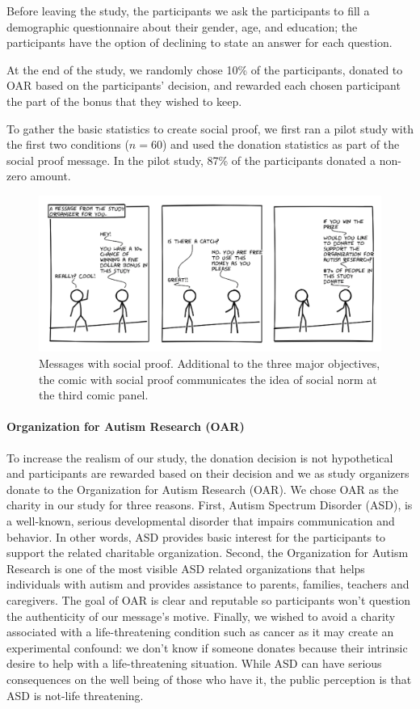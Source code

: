 Before leaving the study, the participants we ask the participants to fill a demographic questionnaire about their gender, age, and education; the participants have the option of declining to state an answer for each question.

At the end of the study, we randomly chose 10\% of the participants, donated to OAR based on the participants' decision, and rewarded each chosen participant the part of the bonus that they wished to keep.

To gather the basic statistics to create social proof, we first ran a pilot study with the first two conditions ($n=60$) and used the donation statistics as part of the social proof message. In the pilot study, 87\% of the participants donated a non-zero amount. 



\begin{figure}[bt]
	\centering
	\includegraphics[width=\columnwidth]{./figures/social_proof.png}
	\caption{Messages with social proof. Additional to the three major objectives, the comic with social proof communicates the idea of social norm at the third comic panel.}
	\label{fig:basic three comic social proof}
\end{figure}

\paragraph{Organization for Autism Research (OAR)}
To increase the realism of our study, the donation decision is not hypothetical and participants are rewarded based on their decision and we as study organizers donate to the Organization for Autism Research (OAR). We chose OAR as the charity in our study for three reasons. First, Autism Spectrum Disorder (ASD), is a well-known, serious developmental disorder that impairs communication and behavior. In other words, ASD provides basic interest for the participants to support the related charitable organization. Second, the Organization for Autism Research is one of the most visible ASD related organizations that helps individuals with autism and provides assistance to parents, families, teachers and caregivers. The goal of OAR is clear and reputable so participants won't question the authenticity of our message's motive. Finally, we wished to avoid a charity associated with a life-threatening condition such as cancer as it may create an experimental confound: we don't know if someone donates because their intrinsic desire to help with a life-threatening situation. While ASD can have serious consequences on the well being of those who have it, the public perception is that ASD is not-life threatening. 

